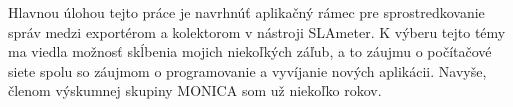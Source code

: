 \documentclass[]{tukediphc}
\begin{document}
Hlavnou úlohou tejto práce je navrhnúť aplikačný rámec pre sprostredkovanie správ medzi exportérom a kolektorom
v nástroji SLAmeter. K výberu tejto témy ma viedla možnosť skĺbenia mojich niekoľkých záľub, a to 
záujmu o počítačové siete spolu so záujmom o programovanie a vyvíjanie nových aplikácii. Navyše, členom 
výskumnej skupiny MONICA som už niekoľko rokov.


\kpredhovoru

\thispagestyle{empty}
\tableofcontents
\newpage

\thispagestyle{empty}
\listoffigures
\newpage

\thispagestyle{empty}
\listoftables
\newpage

\thispagestyle{empty}
\printglossary %
\newpage

\slovnikterminov
\end{document}
